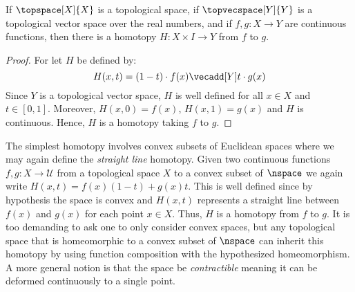 \documentclass[oneside]{book}                                                  %
\begin{document}
                \begin{theorem}
                    If $\topspace[X]{X}$ is a topological space, if
                    $\topvecspace[Y]{Y}$ is a topological vector space over the
                    real numbers, and if $f,g:X\rightarrow{Y}$ are continuous
                    functions, then there is a homotopy
                    $H:X\times{I}\rightarrow{Y}$ from $f$ to $g$.
                \end{theorem}
                \begin{proof}
                    For let $H$ be defined by:
                    \begin{equation}
                        \label{eqn:Straight_Line_Homotopy}%
                        H(x,t)=(1-t)\cdot{f}(x)\vecadd[Y]t\cdot{g}(x)
                    \end{equation}
                    Since $Y$ is a topological vector space, $H$ is well defined
                    for all $x\in{X}$ and $t\in[0,1]$. Moreover, $H(x,0)=f(x)$,
                    $H(x,1)=g(x)$ and $H$ is continuous. Hence, $H$ is a
                    homotopy taking $f$ to $g$.
                \end{proof}
                \begin{example}
                    \label{ex:Straight_Line_Homotopy_Euc_Spaces}%
                    The simplest homotopy involves convex subsets of Euclidean
                    spaces where we may again define the \textit{straight line}
                    homotopy. Given two continuous functions
                    $f,g:X\rightarrow\mathcal{U}$ from a topological space $X$
                    to a convex subset of $\nspace$ we again write
                    $H(x,t)=f(x)(1-t)+g(x)t$. This is well defined since by
                    hypothesis the space is convex and $H(x,t)$ represents a
                    straight line between $f(x)$ and $g(x)$ for each point
                    $x\in{X}$. Thus, $H$ is a homotopy from $f$ to $g$. It is
                    too demanding to ask one to only consider convex spaces, but
                    any topological space that is homeomorphic to a convex
                    subset of $\nspace$ can inherit this homotopy by using
                    function composition with the hypothesized homeomorphism. A
                    more general notion is that the space be
                    \textit{contractible} meaning it can be deformed
                    continuously to a single point.
                \end{example}
\end{document}
